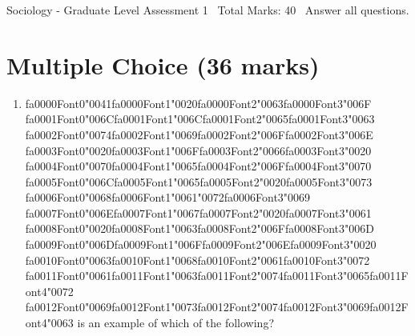 \documentclass[12pt]{article}
\begin{document}
\begin{center}
Sociology - Graduate Level Assessment 1 \
Total Marks: 40 \
Answer all questions.
\end{center}

\section*{Multiple Choice (36 marks)}
\begin{enumerate}[label=\arabic*.]
\item {\csname fa0000Font0\endcsname\char"0041}{\csname fa0000Font1\endcsname\char"0020}{\csname fa0000Font2\endcsname\char"0063}{\csname fa0000Font3\endcsname\char"006F} {\csname fa0001Font0\endcsname\char"006C}{\csname fa0001Font1\endcsname\char"006C}{\csname fa0001Font2\endcsname\char"0065}{\csname fa0001Font3\endcsname\char"0063} {\csname fa0002Font0\endcsname\char"0074}{\csname fa0002Font1\endcsname\char"0069}{\csname fa0002Font2\endcsname\char"006F}{\csname fa0002Font3\endcsname\char"006E} {\csname fa0003Font0\endcsname\char"0020}{\csname fa0003Font1\endcsname\char"006F}{\csname fa0003Font2\endcsname\char"0066}{\csname fa0003Font3\endcsname\char"0020} {\csname fa0004Font0\endcsname\char"0070}{\csname fa0004Font1\endcsname\char"0065}{\csname fa0004Font2\endcsname\char"006F}{\csname fa0004Font3\endcsname\char"0070} {\csname fa0005Font0\endcsname\char"006C}{\csname fa0005Font1\endcsname\char"0065}{\csname fa0005Font2\endcsname\char"0020}{\csname fa0005Font3\endcsname\char"0073} {\csname fa0006Font0\endcsname\char"0068}{\csname fa0006Font1\endcsname\char"0061}{\char"0072}{\csname fa0006Font3\endcsname\char"0069} {\csname fa0007Font0\endcsname\char"006E}{\csname fa0007Font1\endcsname\char"0067}{\csname fa0007Font2\endcsname\char"0020}{\csname fa0007Font3\endcsname\char"0061} {\csname fa0008Font0\endcsname\char"0020}{\csname fa0008Font1\endcsname\char"0063}{\csname fa0008Font2\endcsname\char"006F}{\csname fa0008Font3\endcsname\char"006D} {\csname fa0009Font0\endcsname\char"006D}{\csname fa0009Font1\endcsname\char"006F}{\csname fa0009Font2\endcsname\char"006E}{\csname fa0009Font3\endcsname\char"0020} {\csname fa0010Font0\endcsname\char"0063}{\csname fa0010Font1\endcsname\char"0068}{\csname fa0010Font2\endcsname\char"0061}{\csname fa0010Font3\endcsname\char"0072} {\csname fa0011Font0\endcsname\char"0061}{\csname fa0011Font1\endcsname\char"0063}{\csname fa0011Font2\endcsname\char"0074}{\csname fa0011Font3\endcsname\char"0065}{\csname fa0011Font4\endcsname\char"0072} {\csname fa0012Font0\endcsname\char"0069}{\csname fa0012Font1\endcsname\char"0073}{\csname fa0012Font2\endcsname\char"0074}{\csname fa0012Font3\endcsname\char"0069}{\csname fa0012Font4\endcsname\char"0063} is an example of which of the following?

\end{enumerate}
\end{document}

